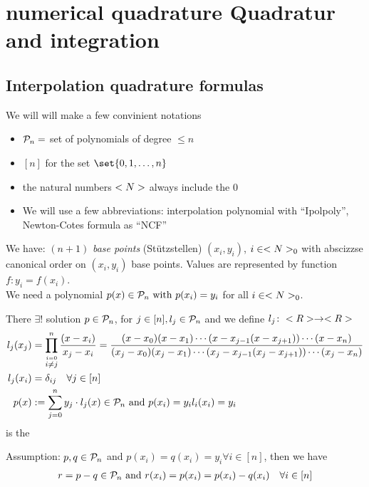 \section{numerical quadrature Quadratur and integration}
\subsection{Interpolation quadrature formulas}
	\begin{*notation}
		We will will make a few convinient notations
		\begin{itemize}
			\item $\mathcal{P}_n=$ set of polynomials of degree $\le n$
			\item $[n]$ for the set $\set{0,1,\dots,n}$
			\item the natural numbers $<N>$ always include the 0
			\item We will use a few abbreviations: interpolation \text polynomial with ``Ipolpoly'', Newton-Cotes formula as ``NCF'' 
		\end{itemize}
	\end{*notation}
We have: $(n+1)$ \emph{base points} (Stützstellen) $(x_i,y_i)$, $i \in <N>_0$ with abscizzse canonical order on $(x_i,y_i)$ base points. Values are represented by function $f\colon y_i=f(x_i)$.\\
We need a polynomial $p(x) \in \mathcal{P}_n \text{ with } p(x_i) = y_i$ for all $i \in <N>_0$.
\begin{*definition}
	There $\exists!$ solution $p \in \mathcal{P}_n$, for $j \in [n], l_j \in \mathcal{P}_n$ and we define $l_j\colon <R> \to <R>$
	\begin{align*}
	l_j(x_j) &= \prod_{\stackrel{i=0}{i\neq j}}^n \frac{(x-x_i)}{x_j-x_i} = \frac{(x-x_0)(x-x_1)\cdots(x-x_{j-1}(x-x_{j+1}))\cdots (x-x_n)}{(x_j-x_0)(x_j-x_1)\cdots(x_j-x_{j-1}(x_j-x_{j+1}))\cdots (x_j-x_n)}\\
	l_j(x_i) &= \delta_{ij} \quad \forall j \in [n]\\
	p(x) &:= \sum_{j=0}^n y_j \cdot l_j(x) \in \mathcal{P}_n \text{ and } p(x_i) = y_i l_i(x_i) = y_i
	\end{align*}
	is the 
\end{*definition}
Assumption: $p,q \in \mathcal{P}_n$ and $p(x_i) = q(x_i)= y_i \forall i \in [n]$, then we have
\begin{align*}
	r = p-q \in \mathcal{P}_n \text{ and } r(x_i) = p(x_i) = p(x_i)-q(x_i) \quad \forall i \in [n]
\end{align*}

